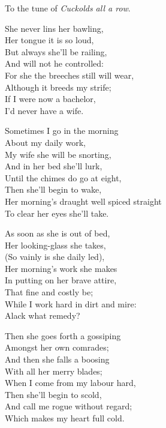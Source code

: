 To the tune of \textit{Cuckolds all a row}.


\smallskip %


\pagebreak

\settowidth{\versewidth}{Her morning’s draught well spiced straight }
\begin{dcverse}\begin{altverse}
She never lins her bawling,\\
Her tongue it is so loud,\\
But always she’ll be railing,\\
And will not he controlled:\\
For she the breeches still will wear,\\
Although it breeds my strife;\\
If I were now a bachelor,\\
I’d never have a wife.
\end{altverse}

\begin{altverse}
Sometimes I go in the morning\\
About my daily work,\\
My wife she will be snorting,\\
And in her bed she’ll lurk,\\
Until the chimes do go at eight,\\
Then she’ll begin to wake,\\
Her morning’s draught well spiced straight \\
To clear her eyes she’ll take.
\end{altverse}

\begin{altverse}
As soon as she is out of bed,\\
Her looking-glass she takes,\\
(So vainly is she daily led),\\
Her morning’s work she makes\\
In putting on her brave attire,\\
That fine and costly be;\\
While I work hard in dirt and mire:\\
Alack what remedy?
\end{altverse}

\begin{altverse}
Then she goes forth a gossiping\\
Amongst her own comrades;\\
And then she falls a boosing\\
With all her merry blades;\\
When I come from my labour hard,\\
Then she’ll begin to scold,\\
And call me rogue without regard;\\
Which makes my heart full cold.
\end{altverse}


\end{dcverse}
